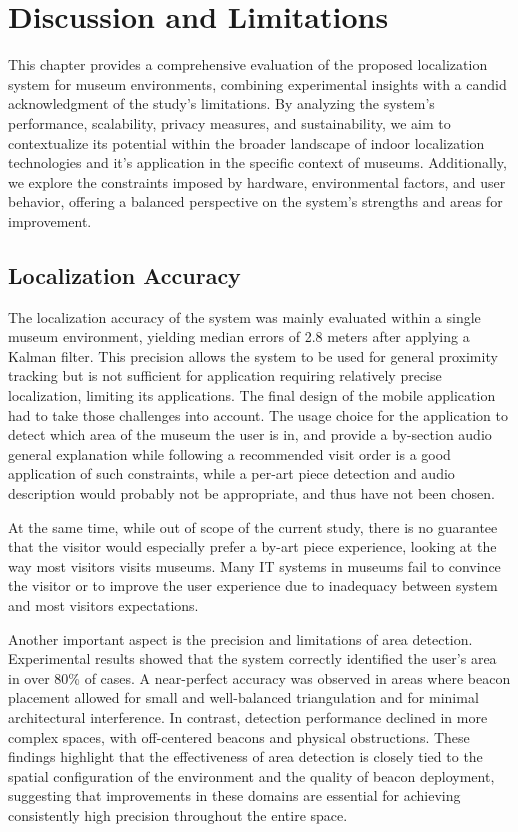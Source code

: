 \chapter{Discussion and Limitations}
\label{chap:discussion}

This chapter provides a comprehensive evaluation of the proposed localization system for museum environments, combining experimental insights with a candid acknowledgment of the study’s limitations. By analyzing the system’s performance, scalability, privacy measures, and sustainability, we aim to contextualize its potential within the broader landscape of indoor localization technologies and it's application in the specific context of museums. Additionally, we explore the constraints imposed by hardware, environmental factors, and user behavior, offering a balanced perspective on the system’s strengths and areas for improvement.

\section{Localization Accuracy}
The localization accuracy of the system was mainly evaluated within a single museum environment, yielding median errors of 2.8 meters after applying a Kalman filter. This precision allows the system to be used for general proximity tracking but is not sufficient for application requiring relatively precise localization, limiting its applications. The final design of the mobile application had to take those challenges into account. The usage choice for the application to detect which area of the museum the user is in, and provide a by-section audio general explanation while following a recommended visit order is a good application of such constraints, while a per-art piece detection and audio description would probably not be appropriate, and thus have not been chosen.

At the same time, while out of scope of the current study, there is no guarantee that the visitor would especially prefer a by-art piece experience, looking at the way most visitors visits museums. Many IT systems in museums fail to convince the visitor or to improve the user experience due to inadequacy between system and most visitors expectations. %

Another important aspect is the precision and limitations of area detection. Experimental results showed that the system correctly identified the user's area in over 80\% of cases. A near-perfect accuracy was observed in areas where beacon placement allowed for small and well-balanced triangulation and for minimal architectural interference. In contrast, detection performance declined in more complex spaces, with off-centered beacons and physical obstructions. These findings highlight that the effectiveness of area detection is closely tied to the spatial configuration of the environment and the quality of beacon deployment, suggesting that improvements in these domains are essential for achieving consistently high precision throughout the entire space.

